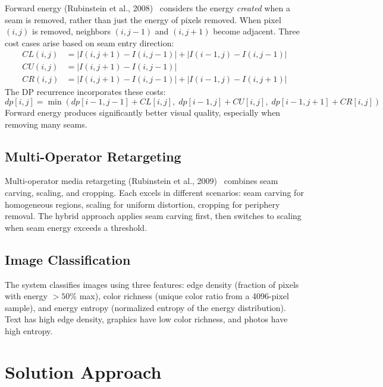 \documentclass[12pt,a4paper]{article}
\begin{document}
Forward energy (Rubinstein et al., 2008)~\cite{rubinstein2008} considers the energy \emph{created} when a seam is removed, rather than just the energy of pixels removed. When pixel $(i,j)$ is removed, neighbors $(i,j-1)$ and $(i,j+1)$ become adjacent. Three cost cases arise based on seam entry direction:
\begin{align*}
    CL(i,j) &= |I(i,j+1) - I(i,j-1)| + |I(i-1,j) - I(i,j-1)| \\
    CU(i,j) &= |I(i,j+1) - I(i,j-1)| \\
    CR(i,j) &= |I(i,j+1) - I(i,j-1)| + |I(i-1,j) - I(i,j+1)|
\end{align*}
The DP recurrence incorporates these costs:
\begin{equation}
    dp[i,j] = \min(dp[i-1,j-1] + CL[i,j],\; dp[i-1,j] + CU[i,j],\; dp[i-1,j+1] + CR[i,j])
\end{equation}
Forward energy produces significantly better visual quality, especially when removing many seams.

\subsection{Multi-Operator Retargeting}

Multi-operator media retargeting (Rubinstein et al., 2009)~\cite{rubinstein2009} combines seam carving, scaling, and cropping. Each excels in different scenarios: seam carving for homogeneous regions, scaling for uniform distortion, cropping for periphery removal. The hybrid approach applies seam carving first, then switches to scaling when seam energy exceeds a threshold.

\subsection{Image Classification}

The system classifies images using three features: edge density (fraction of pixels with energy $> 50\%$ max), color richness (unique color ratio from a 4096-pixel sample), and energy entropy (normalized entropy of the energy distribution). Text has high edge density, graphics have low color richness, and photos have high entropy.

\newpage
\section{Solution Approach}
\end{document}
